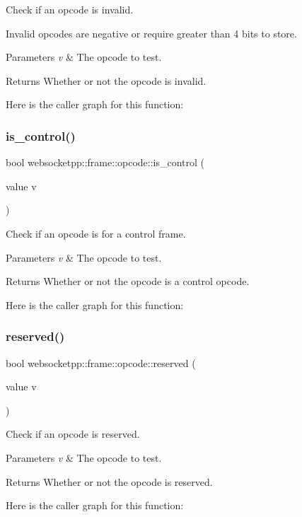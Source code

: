 Check if an opcode is invalid. 

Invalid opcodes are negative or require greater than 4 bits to store.


\begin{DoxyParams}{Parameters}
{\em v} & The opcode to test. \\
\hline
\end{DoxyParams}
\begin{DoxyReturn}{Returns}
Whether or not the opcode is invalid. 
\end{DoxyReturn}
Here is the caller graph for this function\+:
\mbox{\label{namespacewebsocketpp_1_1frame_1_1opcode_aa5e7f94a35f8fb59a925fa01636f08ad}} 
\subsubsection{\texorpdfstring{is\+\_\+control()}{is\_control()}}
{\footnotesize\ttfamily bool websocketpp\+::frame\+::opcode\+::is\+\_\+control (\begin{DoxyParamCaption}\item[{value}]{v }\end{DoxyParamCaption})\hspace{0.3cm}{\ttfamily [inline]}}



Check if an opcode is for a control frame. 


\begin{DoxyParams}{Parameters}
{\em v} & The opcode to test. \\
\hline
\end{DoxyParams}
\begin{DoxyReturn}{Returns}
Whether or not the opcode is a control opcode. 
\end{DoxyReturn}
Here is the caller graph for this function\+:
\mbox{\label{namespacewebsocketpp_1_1frame_1_1opcode_a9890345367f4c8bdf565d62e00afbc61}} 
\subsubsection{\texorpdfstring{reserved()}{reserved()}}
{\footnotesize\ttfamily bool websocketpp\+::frame\+::opcode\+::reserved (\begin{DoxyParamCaption}\item[{value}]{v }\end{DoxyParamCaption})\hspace{0.3cm}{\ttfamily [inline]}}



Check if an opcode is reserved. 


\begin{DoxyParams}{Parameters}
{\em v} & The opcode to test. \\
\hline
\end{DoxyParams}
\begin{DoxyReturn}{Returns}
Whether or not the opcode is reserved. 
\end{DoxyReturn}
Here is the caller graph for this function\+:
